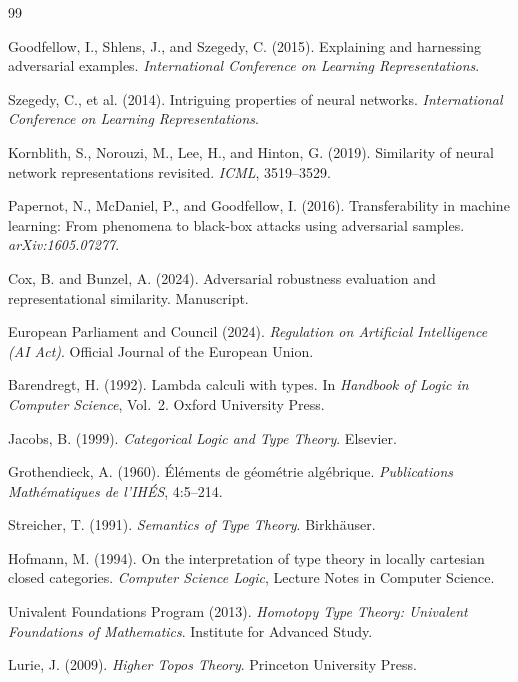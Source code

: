 \documentclass[12pt,a4paper]{article}
\theoremstyle{plain}
\theoremstyle{definition}
\begin{document}
\begin{thebibliography}{99}

 Goodfellow, I., Shlens, J., and Szegedy, C. (2015).
Explaining and harnessing adversarial examples. \textit{International Conference
on Learning Representations}.

 Szegedy, C., et al. (2014). Intriguing properties of
neural networks. \textit{International Conference on Learning Representations}.

 Kornblith, S., Norouzi, M., Lee, H., and Hinton, G.
(2019). Similarity of neural network representations revisited. \textit{ICML},
3519--3529.

 Papernot, N., McDaniel, P., and Goodfellow, I. (2016).
Transferability in machine learning: From phenomena to black-box attacks using
adversarial samples. \textit{arXiv:1605.07277}.

 Cox, B. and Bunzel, A. (2024). Adversarial robustness
evaluation and representational similarity. Manuscript.

 European Parliament and Council (2024). \textit{Regulation
on Artificial Intelligence (AI Act)}. Official Journal of the European Union.

 Barendregt, H. (1992). Lambda calculi with types.
In \textit{Handbook of Logic in Computer Science}, Vol.~2. Oxford University
Press.

 Jacobs, B. (1999). \textit{Categorical Logic and Type
Theory}. Elsevier.

 Grothendieck, A. (1960). \'El\'ements de g\'eom\'etrie
alg\'ebrique. \textit{Publications Math\'ematiques de l'IH\'ES}, 4:5--214.

 Streicher, T. (1991). \textit{Semantics of Type Theory}.
Birkh\"auser.

 Hofmann, M. (1994). On the interpretation of type theory
in locally cartesian closed categories. \textit{Computer Science Logic},
Lecture Notes in Computer Science.

 Univalent Foundations Program (2013). \textit{Homotopy
Type Theory: Univalent Foundations of Mathematics}. Institute for Advanced Study.

 Lurie, J. (2009). \textit{Higher Topos Theory}. Princeton
University Press.


\end{thebibliography}
\end{document}
